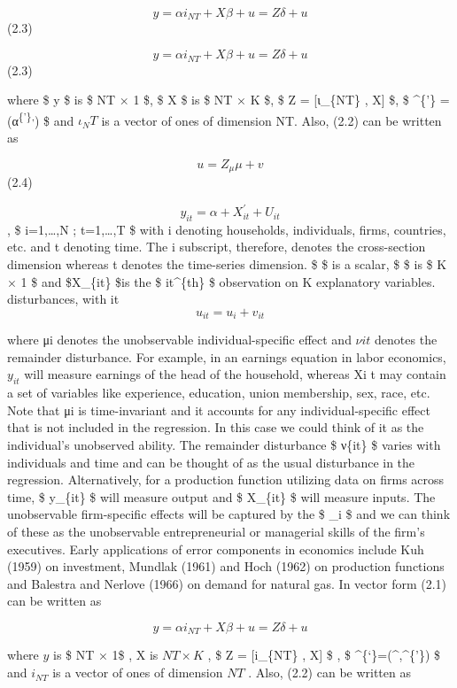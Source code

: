 \documentclass[
]{book}
\begin{document}
\[ y= \alpha i_{NT} + X \beta + u = Z \delta + u      \] (2.3)

\[ y= \alpha i_{NT} + X \beta + u = Z \delta + u      \] (2.3)

where \$ y \$ is \$ NT × 1 \$, \$ X \$ is \$ NT × K \$, \$ Z = {[}ι\_\{NT\} , X{]} \$, \$ \delta\^{}\{'\} = (α\textsuperscript{\{'\},}) \$ and \(ι_NT\) is a vector of ones of dimension NT. Also, (2.2) can be written as

\[ u=Z_\mu \mu +v  \] (2.4)

\[  y_{it} = \alpha + X_{it}^{'} + U_{it}   \] , \$ i=1,\ldots,N ; t=1,\ldots,T \$ with i denoting households, individuals, firms, countries, etc. and t denoting time. The i subscript, therefore, denotes the cross-section dimension whereas t denotes the time-series dimension. \$ \alpha \$ is a scalar, \$ \beta \$ is \$ K × 1 \$ and \$X\_\{it\} \$is the \$ it\^{}\{th\} \$ observation on K explanatory variables. disturbances, with it \[ u_{it}=u_i  + v_{it}     \]

where μi denotes the unobservable individual-specific effect and \(ν{it}\) denotes the remainder disturbance. For example, in an earnings equation in labor economics, \(y_{it}\) will measure earnings of the head of the household, whereas Xi t may contain a set of variables like experience, education, union membership, sex, race, etc. Note that μi is time-invariant and it accounts for any individual-specific effect that is not included in the regression. In this case we could think of it as the individual's unobserved ability. The remainder disturbance \$ ν\{it\} \$ varies with individuals and time and can be thought of as the usual disturbance in the regression. Alternatively, for a production function utilizing data on firms across time, \$ y\_\{it\} \$ will measure output and \$ X\_\{it\} \$ will measure inputs. The unobservable firm-specific effects will be captured by the \$ \mu\_i \$ and we can think of these as the unobservable entrepreneurial or managerial skills of the firm's executives. Early applications of error components in economics include Kuh (1959) on investment, Mundlak (1961) and Hoch (1962) on production functions and Balestra and Nerlove (1966) on demand for natural gas. In vector form (2.1) can be written as

\[ y= \alpha i_{NT}  + X\beta +u = Z\delta + u \]

where \(y\) is \$ NT × 1\$ , X is \(NT × K\) , \$ Z = {[}i\_\{NT\} , X{]} \$ , \$ \delta\^{}\{`\}=(\^{},\beta\^{}\{'\}) \$ and \(i_{NT}\) is a vector of ones of dimension \(NT\) . Also, (2.2) can be written as
\end{document}
